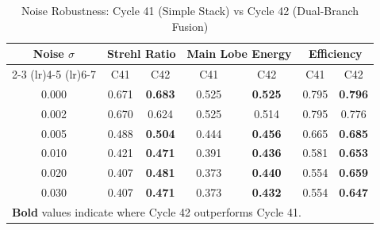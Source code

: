 \begin{table}[htbp]
\centering
\caption{Noise Robustness: Cycle 41 (Simple Stack) vs Cycle 42 (Dual-Branch Fusion)}
\label{tab:noise_robustness}
\begin{tabular}{ccccccc}
\toprule
\multirow{2}{*}{\textbf{Noise $\sigma$}} & \multicolumn{2}{c}{\textbf{Strehl Ratio}} & \multicolumn{2}{c}{\textbf{Main Lobe Energy}} & \multicolumn{2}{c}{\textbf{Efficiency}} \\
\cmidrule(lr){2-3} \cmidrule(lr){4-5} \cmidrule(lr){6-7}
 & C41 & C42 & C41 & C42 & C41 & C42 \\
\midrule
0.000 & 0.671 & \textbf{0.683} & 0.525 & \textbf{0.525} & 0.795 & \textbf{0.796} \\
0.002 & 0.670 & 0.624 & 0.525 & 0.514 & 0.795 & 0.776 \\
0.005 & 0.488 & \textbf{0.504} & 0.444 & \textbf{0.456} & 0.665 & \textbf{0.685} \\
0.010 & 0.421 & \textbf{0.471} & 0.391 & \textbf{0.436} & 0.581 & \textbf{0.653} \\
0.020 & 0.407 & \textbf{0.481} & 0.373 & \textbf{0.440} & 0.554 & \textbf{0.659} \\
0.030 & 0.407 & \textbf{0.471} & 0.373 & \textbf{0.432} & 0.554 & \textbf{0.647} \\
\bottomrule
\multicolumn{7}{l}{\textbf{Bold} values indicate where Cycle 42 outperforms Cycle 41.} \\
\end{tabular}
\end{table}
